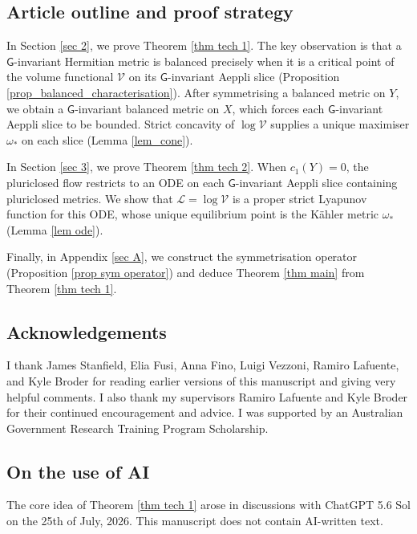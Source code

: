 \documentclass[11pt,reqno]{amsart}
\newcommand{\G}{\mathsf {G}}
\newcommand{\V}{\mathcal {V}}
\renewcommand{\L}{\mathcal L}
\theoremstyle{plain}
\theoremstyle{definition}
\theoremstyle{remark}
\begin{document}


\subsection{Article outline and proof strategy}
In Section \ref{sec 2}, we prove Theorem \ref{thm tech 1}.  The key observation is that a $\G$-invariant Hermitian metric is balanced  precisely when it is a critical point of the volume functional $\V$ on its $\G$-invariant Aeppli slice  (Proposition \ref{prop_balanced_characterisation}). After symmetrising  a balanced metric on $Y$, we obtain a $\G$-invariant balanced metric on $X$, which forces each $\G$-invariant Aeppli slice to be bounded. Strict concavity of $\log \V$ supplies a unique maximiser $\omega_*$ on each slice (Lemma \ref{lem_cone}).



In Section \ref{sec 3}, we prove Theorem \ref{thm tech 2}. When $c_1(Y) = 0$, the pluriclosed flow restricts to an ODE on each $\G$-invariant Aeppli slice containing pluriclosed metrics. We show that $\L = \log \V$ is a proper strict Lyapunov function for this ODE, whose unique equilibrium point is the K\"ahler metric $\omega_*$ (Lemma \ref{lem ode}).

Finally, in Appendix \ref{sec A}, we construct the symmetrisation operator (Proposition \ref{prop sym operator}) and deduce Theorem \ref{thm main} from Theorem \ref{thm tech 1}.


\subsection{Acknowledgements} I thank James Stanfield, Elia Fusi, Anna Fino,  Luigi Vezzoni, Ramiro Lafuente, and Kyle Broder for reading  earlier versions of this manuscript and giving very helpful comments.
I also thank my supervisors Ramiro Lafuente and Kyle Broder for their continued encouragement and advice. 
I was supported by an Australian Government Research Training Program Scholarship.

\subsection{On the use of AI} The core idea of   Theorem \ref{thm tech 1} arose in discussions with  ChatGPT 5.6 Sol on the 25th of July, 2026.  This manuscript
does not contain AI-written text. 
\end{document}
